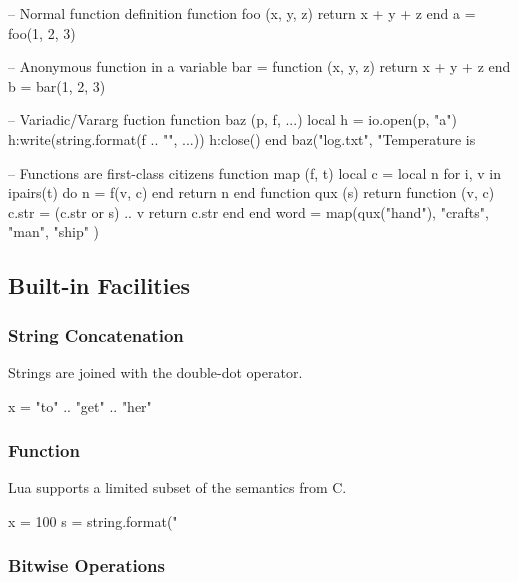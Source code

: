 \begin{LuaCode}
-- Normal function definition
function foo (x, y, z)
	return x + y + z
end
a = foo(1, 2, 3)
\end{LuaCode}

\begin{LuaCode}
-- Anonymous function in a variable
bar = function (x, y, z)
	return x + y + z
end
b = bar(1, 2, 3)
\end{LuaCode}

\begin{LuaCode}
-- Variadic/Vararg fuction
function baz (p, f, ...)
	local h = io.open(p, "a")
	h:write(string.format(f .. "\n", ...))
	h:close()
end
baz("log.txt", "Temperature is %
\end{LuaCode}

\begin{LuaCode}
-- Functions are first-class citizens
function map (f, t)
	local c = {}
	local n
	for i, v in ipairs(t) do
		n = f(v, c)
	end
	return n
end
function qux (s)
	return function (v, c)
		c.str = (c.str or s) .. v
		return c.str
	end
end
word = map(qux("hand"), { "crafts", "man", "ship" })
\end{LuaCode}

\subsection{Built-in Facilities}

\subsubsection{String Concatenation}

Strings are joined with the double-dot operator.

\begin{LuaCode}
x = "to" .. "get" .. "her"
\end{LuaCode}

\subsubsection{ Function}

Lua supports a limited subset of the  semantics from C.

\begin{LuaCode}
x = 100
s = string.format("%
\end{LuaCode}

\subsubsection{Bitwise Operations}

